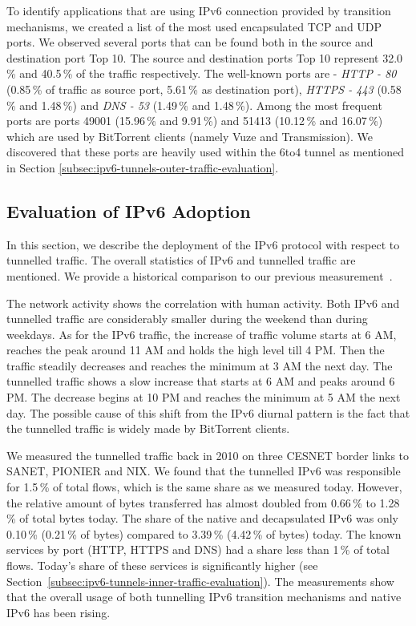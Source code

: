 To identify applications that are using IPv6 connection provided by transition mechanisms, we created a list of the most used encapsulated TCP and UDP ports. We observed several ports that can be found both in the source and destination port Top 10. The source and destination ports Top 10 represent 32.0\,\% and 40.5\,\% of the traffic respectively. The well-known ports are - \emph{HTTP - 80} (0.85\,\% of traffic as source port, 5.61\,\% as destination port), \emph{HTTPS - 443} (0.58\,\% and 1.48\,\%) and \emph{DNS - 53} (1.49\,\% and 1.48\,\%). Among the most frequent ports are ports 49001 (15.96\,\% and 9.91\,\%) and 51413 (10.12\,\% and 16.07\,\%) which are used by BitTorrent clients (namely Vuze
and Transmission). We discovered that these ports are heavily used within the 6to4 tunnel as mentioned in Section \ref{subsec:ipv6-tunnels-outer-traffic-evaluation}.

\subsection{Evaluation of IPv6 Adoption} \label{subsec:ipv6-tunnels-evaluation-of-ipv6}

In this section, we describe the deployment of the IPv6 protocol with respect to tunnelled traffic. The overall statistics of IPv6 and tunnelled traffic are mentioned. We provide a historical comparison to our previous measurement~\cite{Elich-2011-Monitoring}. 

The network activity shows the correlation with human activity. Both IPv6 and tunnelled traffic are considerably smaller during the weekend than during weekdays. As for the IPv6 traffic, the increase of traffic volume starts at 6 AM, reaches the peak around 11 AM and holds the high level till 4 PM. Then the traffic steadily decreases and reaches the minimum at 3 AM the next day. The tunnelled traffic shows a slow increase that starts at 6 AM and peaks around 6 PM. The decrease begins at 10 PM and reaches the minimum at 5 AM the next day. The possible cause of this shift from the IPv6 diurnal pattern is the fact that the tunnelled traffic is widely made by BitTorrent clients.

We measured the tunnelled traffic back in 2010 on three CESNET border links to SANET, PIONIER and NIX. We found that the tunnelled IPv6 was responsible for 1.5\,\% of total flows, which is the same share as we measured today. However, the relative amount of bytes transferred has almost doubled from 0.66\,\% to 1.28\,\% of total bytes today. The share of the native and decapsulated IPv6 was only 0.10\,\% (0.21\,\% of bytes) compared to 3.39\,\% (4.42\,\% of bytes) today. The known services by port (HTTP, HTTPS and DNS) had a share less than 1\,\% of total flows. Today's share of these services is significantly higher (see Section~\ref{subsec:ipv6-tunnels-inner-traffic-evaluation}). The measurements show that the overall usage of both tunnelling IPv6 transition mechanisms and native IPv6 has been rising.

